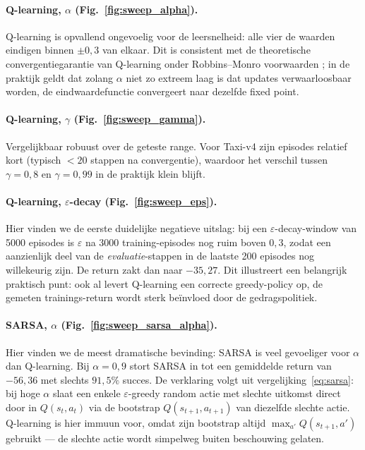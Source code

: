 \documentclass[11pt,a4paper]{article}
\begin{document}
\paragraph{Q-learning, $\alpha$ (Fig.~\ref{fig:sweep_alpha}).}
Q-learning is opvallend ongevoelig voor de leersnelheid: alle vier de
waarden eindigen binnen $\pm 0{,}3$ van elkaar. Dit is consistent met
de theoretische convergentiegarantie van Q-learning onder Robbins--Monro
voorwaarden \cite{sutton_barto_2018}; in de praktijk geldt dat zolang
$\alpha$ niet zo extreem laag is dat updates verwaarloosbaar worden,
de eindwaardefunctie convergeert naar dezelfde fixed point.

\paragraph{Q-learning, $\gamma$ (Fig.~\ref{fig:sweep_gamma}).}
Vergelijkbaar robuust over de geteste range. Voor Taxi-v4 zijn episodes
relatief kort (typisch $<20$ stappen na convergentie), waardoor het
verschil tussen $\gamma=0{,}8$ en $\gamma=0{,}99$ in de praktijk klein
blijft.

\paragraph{Q-learning, $\varepsilon$-decay (Fig.~\ref{fig:sweep_eps}).}
Hier vinden we de eerste duidelijke negatieve uitslag: bij een
$\varepsilon$-decay-window van 5000 episodes is $\varepsilon$ na 3000
training-episodes nog ruim boven $0{,}3$, zodat een aanzienlijk deel
van de \emph{evaluatie}-stappen in de laatste 200 episodes nog
willekeurig zijn. De return zakt dan naar $-35{,}27$. Dit illustreert
een belangrijk praktisch punt: ook al levert Q-learning een correcte
greedy-policy op, de gemeten trainings-return wordt sterk be\"invloed
door de gedragspolitiek.

\paragraph{SARSA, $\alpha$ (Fig.~\ref{fig:sweep_sarsa_alpha}).}
Hier vinden we de meest dramatische bevinding: SARSA is veel
gevoeliger voor $\alpha$ dan Q-learning. Bij $\alpha=0{,}9$ stort SARSA
in tot een gemiddelde return van $-56{,}36$ met slechts $91{,}5\%$
succes. De verklaring volgt uit vergelijking~\eqref{eq:sarsa}: bij
hoge $\alpha$ slaat een enkele $\varepsilon$-greedy random actie met
slechte uitkomst direct door in $Q(s_t, a_t)$ via de bootstrap
$Q(s_{t+1}, a_{t+1})$ van diezelfde slechte actie. Q-learning is hier
immuun voor, omdat zijn bootstrap altijd $\max_{a'} Q(s_{t+1}, a')$
gebruikt --- de slechte actie wordt simpelweg buiten beschouwing
gelaten.
\end{document}
